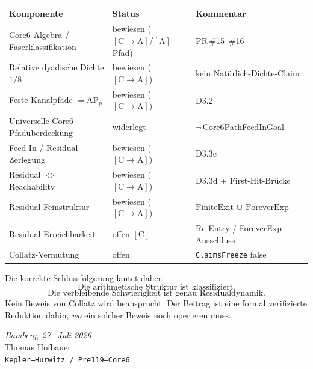 \documentclass[11pt,a4paper]{article}
\theoremstyle{definition}
\theoremstyle{remark}
\newcommand{\CA}{\ensuremath{[\mathrm{C}\!\to\!\mathrm{A}]}}
\newcommand{\tagA}{\ensuremath{[\mathrm{A}]}}
\newcommand{\tagC}{\ensuremath{[\mathrm{C}]}}
\newcommand{\FiniteExit}{\mathrm{FiniteExit}}
\newcommand{\Forever}{\mathrm{ForeverExp}}
\newcommand{\AP}{\mathrm{AP}}
\begin{document}
\begin{center}
\small
\begin{tabular}{@{}p{4.8cm}p{2.6cm}p{4.6cm}@{}}
\toprule
Komponente & Status & Kommentar \\
\midrule
Core6-Algebra / Faserklassifikation
  & bewiesen (\CA/\tagA-Pfad) & PR\,\#15--\#16 \\
Relative dyadische Dichte $1/8$
  & bewiesen (\CA) & kein Natürlich-Dichte-Claim \\
Feste Kanalpfade $=\AP_p$
  & bewiesen (\CA) & D3.2 \\
Universelle Core6-Pfadüberdeckung
  & widerlegt & $\neg$\,Core6PathFeedInGoal \\
Feed-In / Residual-Zerlegung
  & bewiesen (\CA) & D3.3c \\
Residual $\Leftrightarrow$ Reachability
  & bewiesen (\CA) & D3.3d + First-Hit-Brücke \\
Residual-Feinstruktur
  & bewiesen (\CA)
  & $\FiniteExit\,\dot\cup\,\Forever$ \\
Residual-Erreichbarkeit
  & offen \tagC & Re-Entry / ForeverExp-Ausschluss \\
Collatz-Vermutung
  & offen & \texttt{ClaimsFreeze} false \\
\bottomrule
\end{tabular}
\end{center}

Die korrekte Schlussfolgerung lautet daher:
\[
  \boxed{\text{Die arithmetische Struktur ist klassifiziert.}}
\]
\[
  \boxed{\text{Die verbleibende Schwierigkeit ist genau Residualdynamik.}}
\]
Kein Beweis von Collatz wird beansprucht. Der Beitrag ist eine formal
verifizierte Reduktion dahin, \emph{wo} ein solcher Beweis noch operieren muss.

\vspace{1.2em}
\begin{flushright}
\textit{Bamberg, 27.\ Juli 2026}\\
Thomas Hofbauer\\
\texttt{Kepler--Hurwitz / Pre119--Core6}
\end{flushright}
\end{document}
